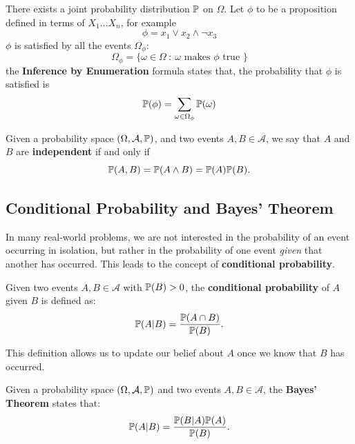\documentclass[10pt, letterpaper]{report}
\begin{document}
There exists a joint probability distribution ${\mathbb P}$ on $\Omega$. Let $\phi$ to be a proposition defined in terms of $X_1\dots X_n$, for example
\begin{equation}
	\phi=x_1\lor x_2 \land \lnot x_3
\end{equation}
$\phi$ is satisfied by all the events $\Omega_\phi$:
\begin{equation}
	\Omega_\phi=\{\omega\in \Omega \ : \ \omega \text{ makes } \phi \text{ true }\}
\end{equation}
the \textbf{Inference by Enumeration} formula states that, the probability that $\phi$ is satisfied is
\begin{equation}
	{\mathbb P}(\phi)=\sum_{\omega\in  \Omega_\phi}{\mathbb P}(\omega)
\end{equation}

\begin{definition}
	Given a probability space $(\Omega,\mathcal A,{\mathbb P})$, and two events $A,B\in\mathcal A$, we say that $A$ and $B$ are \textbf{independent} if and only if
	\begin{equation}
		{\mathbb P}(A, B)={\mathbb P}(A\land B)={\mathbb P}(A){\mathbb P}(B).
	\end{equation}
\end{definition}

\subsection{Conditional Probability and Bayes' Theorem}

In many real-world problems, we are not interested in the probability of an event occurring in isolation, but rather in the probability of one event \emph{given} that another has occurred.  
This leads to the concept of \textbf{conditional probability}.

\begin{definition}
	Given two events $A,B \in \mathcal A$ with ${\mathbb P}(B) > 0$, the \textbf{conditional probability} of $A$ given $B$ is defined as:
	\begin{equation}
		{\mathbb P}(A|B) = \frac{{\mathbb P}(A \cap B)}{{\mathbb P}(B)}.
	\end{equation}
\end{definition}

This definition allows us to update our belief about $A$ once we know that $B$ has occurred.

\bigskip
\begin{theorem}
	Given a probability space $(\Omega,\mathcal A,{\mathbb P})$ and two events $A,B\in\mathcal A$, the \textbf{Bayes' Theorem} states that:
	\begin{equation}
		{\mathbb P}(A|B) = \frac{{\mathbb P}(B|A){\mathbb P}(A)}{{\mathbb P}(B)}.
	\end{equation}
\end{theorem}
\end{document}
